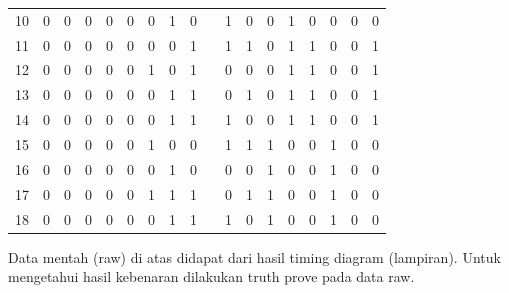 \begin{table}[H]
\begin{tabular}{|c|c|c|c|c|c|c|c|c|c|c|c|c|c|c|c|c|c|}
		\cline{1-9}\cline{11-18}    10    & 0     & 0     & 0     & 0     & 0     & 0     & 1     & 0     &       & 1     & 0     & 0     & 1     & 0     & 0     & 0     & 0 \bigstrut\\
		\cline{1-9}\cline{11-18}    11    & 0     & 0     & 0     & 0     & 0     & 0     & 0     & 1     &       & 1     & 1     & 0     & 1     & 1     & 0     & 0     & 1 \bigstrut\\
		\cline{1-9}\cline{11-18}    12    & 0     & 0     & 0     & 0     & 0     & 1     & 0     & 1     &       & 0     & 0     & 0     & 1     & 1     & 0     & 0     & 1 \bigstrut\\
		\cline{1-9}\cline{11-18}    13    & 0     & 0     & 0     & 0     & 0     & 0     & 1     & 1     &       & 0     & 1     & 0     & 1     & 1     & 0     & 0     & 1 \bigstrut\\
		\cline{1-9}\cline{11-18}    14    & 0     & 0     & 0     & 0     & 0     & 0     & 1     & 1     &       & 1     & 0     & 0     & 1     & 1     & 0     & 0     & 1 \bigstrut\\
		\cline{1-9}\cline{11-18}    15    & 0     & 0     & 0     & 0     & 0     & 1     & 0     & 0     &       & 1     & 1     & 1     & 0     & 0     & 1     & 0     & 0 \bigstrut\\
		\cline{1-9}\cline{11-18}    16    & 0     & 0     & 0     & 0     & 0     & 0     & 1     & 0     &       & 0     & 0     & 1     & 0     & 0     & 1     & 0     & 0 \bigstrut\\
		\cline{1-9}\cline{11-18}    17    & 0     & 0     & 0     & 0     & 0     & 1     & 1     & 1     &       & 0     & 1     & 1     & 0     & 0     & 1     & 0     & 0 \bigstrut\\
		\cline{1-9}\cline{11-18}    18    & 0     & 0     & 0     & 0     & 0     & 0     & 1     & 1     &       & 1     & 0     & 1     & 0     & 0     & 1     & 0     & 0 \bigstrut\\
		\hline
	\end{tabular}%
\end{table}%

Data mentah (raw) di atas didapat dari hasil timing diagram (lampiran). Untuk mengetahui hasil kebenaran dilakukan truth prove pada data raw.

